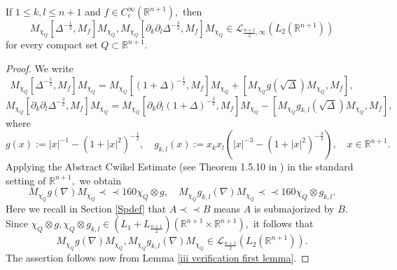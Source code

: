\documentclass[12pt]{amsart}
\begin{document}
\begin{lemma}\label{iii verification second lemma} If $1\leq k,l\leq n+1$ and $f\in C^{\infty}_c(\mathbb{R}^{n+1}),$ then
$$M_{\chi_Q}[\Delta^{-\frac12},M_f]M_{\chi_Q},M_{\chi_Q}[\partial_k\partial_l\Delta^{-\frac32},M_f]M_{\chi_Q}\in \mathcal{L}_{\frac{n+1}{2},\infty}(L_2(\mathbb{R}^{n+1}))$$
for every compact set $Q\subset\mathbb{R}^{n+1}.$
\end{lemma}
\begin{proof} We write
$$M_{\chi_Q}[\Delta^{-\frac12},M_f]M_{\chi_Q}=M_{\chi_Q}[(1+\Delta)^{-\frac12},M_f]M_{\chi_Q}+[M_{\chi_Q}g(\sqrt{\Delta})M_{\chi_Q},M_f],$$
$$M_{\chi_Q}[\partial_k\partial_l\Delta^{-\frac32},M_f]M_{\chi_Q}=M_{\chi_Q}[\partial_k\partial_l(1+\Delta)^{-\frac32},M_f]M_{\chi_Q}-[M_{\chi_Q}g_{k,l}(\sqrt{\Delta})M_{\chi_Q},M_f],$$		
where
$$g(x):=|x|^{-1}-(1+|x|^2)^{-\frac12},\quad g_{k,l}(x):=x_kx_l(|x|^{-3}-(1+|x|^2)^{-\frac32}),\quad x\in\mathbb{R}^{n+1}.$$
Applying the Abstract Cwikel Estimate (see Theorem 1.5.10 in \cite{LSZ2}) in the standard setting of $\mathbb{R}^{n+1},$ we obtain
$$M_{\chi_Q}g(\nabla)M_{\chi_Q}\prec\prec 160\chi_Q\otimes g,\quad M_{\chi_Q}g_{k,l}(\nabla)M_{\chi_Q}\prec\prec 160\chi_Q\otimes g_{k,l}.$$
Here we recall in Section \ref{Spdef} that $ A \prec\prec B$ means $A$ is submajorized by $B$.
Since $\chi_Q\otimes g,\chi_Q\otimes g_{k,l}\in (L_1+L_{\frac{n+1}{2}})(\mathbb{R}^{n+1}\times\mathbb{R}^{n+1}),$ it follows that
$$M_{\chi_Q}g(\nabla)M_{\chi_Q},M_{\chi_Q}g_{k,l}(\nabla)M_{\chi_Q}\in\mathcal{L}_{\frac{n+1}{2}}(L_2(\mathbb{R}^{n+1})).$$
The assertion follows now from Lemma \ref{iii verification first lemma}.
\end{proof}
\end{document}
